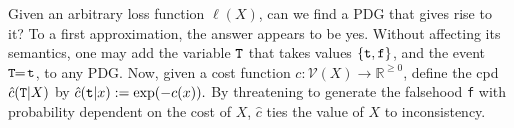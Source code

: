 \documentclass[twoside]{article}
\makeatletter
\theoremstyle{plain}
\theoremstyle{definition}
\newcommand{\V}{\mathcal V}
\newcommand\aar{\@ifstar\aar@one@star\aar@plain}
\newcommand\aar@one@star{\@ifstar\aar@resize{\aar@plain*}}
\newcommand\aar@resize[1]{\sbox{\aar@content}{#1}\scaleleftright[3.8ex]
		{\Biggl\langle\!\!\!\!\Biggl\langle}{\usebox{\aar@content}}
		{\Biggr\rangle\!\!\!\!\Biggr\rangle}}
\makeatother
\begin{document}
Given an arbitrary loss function $\ell(X)$, can we find a PDG that gives rise to it?
To a first approximation, the answer appears to be yes.
%
%
%
%
Without affecting its semantics, one may add the variable ${\tt T}$ that takes values $\{{\tt t}, {\tt f}\}$, and the event ${\tt T} \!\!=\! {\tt t}$, to any PDG.
%
Now, given a
cost function $c: \V(X) \to \mathbb R^{\ge 0}$,
define the cpd $\hat c({\tt T} |X)$ by
$
	\hat c({\tt t} | x) := \exp( - c(x)).
$
By threatening to generate the falsehood {\tt f} with probability dependent on the cost of $X$, $\hat c$ ties the value of $X$ to inconsistency.
% 
\end{document}
